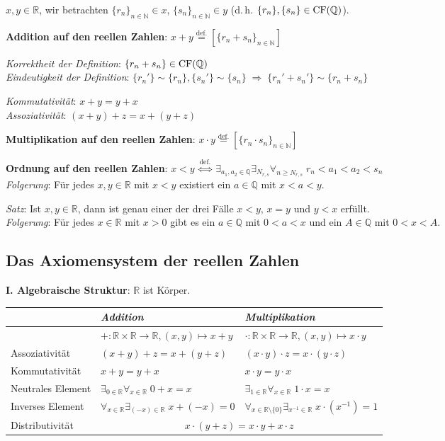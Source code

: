 $x, y \in \mathbb{R}$, wir betrachten $\{r_n\}_{n \in \mathbb{N}} \in x$,
$\{s_n\}_{n \in \mathbb{N}} \in y$ (d.\,h.
$\{r_n\}, \{s_n\} \in \operatorname{CF}(\mathbb{Q})$).

\textbf{Addition auf den reellen Zahlen}:
$x + y \overset{\text{def.}}{=} [\{r_n + s_n\}_{n \in \mathbb{N}}]$

\emph{Korrektheit der Definition}:
$\{r_n + s_n\} \in \operatorname{CF}(\mathbb{Q})$ \\
\emph{Eindeutigkeit der Definition}:
$\{r_n'\} \sim \{r_n\}, \{s_n'\} \sim \{s_n\} \;\Rightarrow\;
\{r_n' + s_n'\} \sim \{r_n + s_n\}$

\emph{Kommutativität}: $x + y = y + x$ \\
\emph{Assoziativität}: $(x + y) + z = x + (y + z)$

\textbf{Multiplikation auf den reellen Zahlen}:
$x \cdot y \overset{\text{def.}}{=} [\{r_n \cdot s_n\}_{n \in \mathbb{N}}]$

\textbf{Ordnung auf den reellen Zahlen}:
$x < y \overset{\text{def.}}{\;\Leftrightarrow\;}
\exists_{a_1, a_2 \in \mathbb{Q}} \exists_{N_{r,s}}
\forall_{n \ge N_{r,s}}\; r_n < a_1 < a_2 < s_n$ \\
\emph{Folgerung}: Für jedes $x, y \in \mathbb{R}$ mit $x < y$ existiert ein
$a \in \mathbb{Q}$ mit $x < a < y$.

\emph{Satz}: Ist $x, y \in \mathbb{R}$, dann ist genau einer der drei Fälle
$x < y$, $x = y$ und $y < x$ erfüllt. \\
\emph{Folgerung}: Für jedes $x \in \mathbb{R}$ mit $x > 0$ gibt es ein
$a \in \mathbb{Q}$ mit $0 < a < x$ und ein $A \in \mathbb{Q}$ mit $0 < x < A$.

\subsection{%
    Das Axiomensystem der reellen Zahlen%
}

\textbf{I. Algebraische Struktur}: $\mathbb{R}$ ist Körper.

\begin{tabular}{l|l|l}
    & \emph{Addition} & \emph{Multiplikation} \\ \hline
    & $\boldsymbol{+}: \mathbb{R} \times \mathbb{R} \rightarrow \mathbb{R},
    (x, y) \mapsto x + y$ &
    $\boldsymbol{\cdot}: \mathbb{R} \times \mathbb{R} \rightarrow \mathbb{R},
    (x, y) \mapsto x \cdot y$ \\
    Assoziativität & $(x + y) + z = x + (y + z)$ &
    $(x \cdot y) \cdot z = x \cdot (y \cdot z)$ \\
    Kommutativität & $x + y = y + x$ & $x \cdot y = y \cdot x$ \\
    Neutrales Element &
    $\exists_{0 \in \mathbb{R}} \forall_{x \in \mathbb{R}}\; 0 + x = x$ &
    $\exists_{1 \in \mathbb{R}} \forall_{x \in \mathbb{R}}\; 1 \cdot x = x$ \\
    Inverses Element &
    $\forall_{x \in \mathbb{R}} \exists_{(-x) \in \mathbb{R}}\; x + (-x) = 0$ &
    $\forall_{x \in \mathbb{R} \setminus \{0\}}
    \exists_{x^{-1} \in \mathbb{R}}\; x \cdot (x^{-1}) = 1$ \\
    Distributivität &
    \multicolumn{2}{c}{$x \cdot (y + z) = x \cdot y + x \cdot z$}
\end{tabular}

